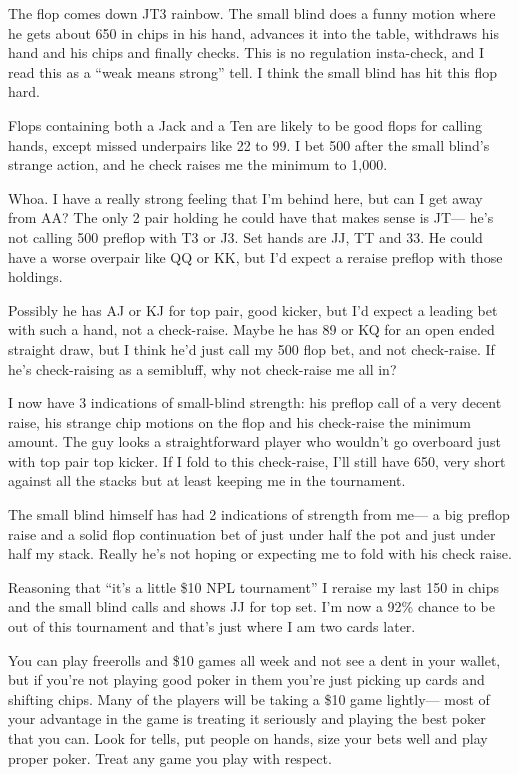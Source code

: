 The flop comes down JT3 rainbow. The small blind does a funny motion
where he gets about 650 in chips in his hand, advances it into the
table, withdraws his hand and his chips and finally checks. This is
no regulation insta-check, and I read this as a ``weak means strong''
tell. I think the small blind has hit this flop hard.

Flops containing both a Jack and a Ten are likely to be good flops
for calling hands, except missed underpairs like 22 to 99. I bet
500 after the small blind's strange action, and he check raises me
the minimum to 1,000.

Whoa. I have a really strong feeling that I'm behind here, but can
I get away from AA? The only 2 pair holding he could have that makes
sense is JT--- he's not calling 500 preflop with T3 or J3. Set hands
are JJ, TT and 33. He could have a worse overpair like QQ or KK,
but I'd expect a reraise preflop with those holdings.

Possibly he has AJ or KJ for top pair, good kicker, but I'd
expect a leading bet with such a hand, not a check-raise. Maybe he
has 89 or KQ for an open ended straight draw, but I think he'd just
call my 500 flop bet, and not check-raise. If he's check-raising
as a semibluff, why not check-raise me all in?

I now have 3 indications of small-blind strength: his preflop call
of a very decent raise, his strange chip motions on the flop and his
check-raise the minimum amount. The guy looks a straightforward player
who wouldn't go overboard just with top pair top kicker. If I fold
to this check-raise, I'll still have 650, very short
against all the stacks but at least keeping me in the tournament.

The small blind himself has had 2 indications of strength from
me--- a big preflop raise and a solid flop continuation bet of just
under half the pot and just under half my stack. Really he's not hoping
or expecting me to fold with his check raise.

Reasoning that ``it's a little \$10 NPL tournament'' I reraise my
last 150 in chips and the small blind calls and shows JJ for top set.
I'm now a 92\% chance to be out of this tournament and that's just where
I am two cards later.

You can play freerolls and \$10 games all week and not see a dent
in your wallet, but if you're not playing good poker in them you're
just picking up cards and shifting chips. Many of the players will
be taking a \$10 game lightly--- most of your advantage in the game
is treating it seriously and playing the best poker that you can.
Look for tells, put people on hands, size your bets well and
play proper poker. Treat any game you play with respect.

